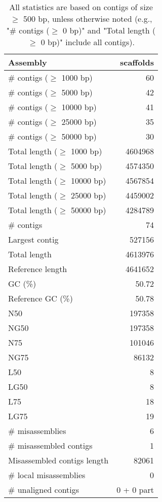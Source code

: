 \documentclass[12pt,a4paper]{article}
\begin{document}
\begin{table}[ht]
\begin{center}
\caption{All statistics are based on contigs of size $\geq$ 500 bp, unless otherwise noted (e.g., "\# contigs ($\geq$ 0 bp)" and "Total length ($\geq$ 0 bp)" include all contigs).}
\begin{tabular}{|l*{1}{|r}|}
\hline
Assembly & scaffolds \\ \hline
\# contigs ($\geq$ 1000 bp) & 60 \\ \hline
\# contigs ($\geq$ 5000 bp) & 42 \\ \hline
\# contigs ($\geq$ 10000 bp) & 41 \\ \hline
\# contigs ($\geq$ 25000 bp) & 35 \\ \hline
\# contigs ($\geq$ 50000 bp) & 30 \\ \hline
Total length ($\geq$ 1000 bp) & 4604968 \\ \hline
Total length ($\geq$ 5000 bp) & 4574350 \\ \hline
Total length ($\geq$ 10000 bp) & 4567854 \\ \hline
Total length ($\geq$ 25000 bp) & 4459002 \\ \hline
Total length ($\geq$ 50000 bp) & 4284789 \\ \hline
\# contigs & 74 \\ \hline
Largest contig & 527156 \\ \hline
Total length & 4613976 \\ \hline
Reference length & 4641652 \\ \hline
GC (\%) & 50.72 \\ \hline
Reference GC (\%) & 50.78 \\ \hline
N50 & 197358 \\ \hline
NG50 & 197358 \\ \hline
N75 & 101046 \\ \hline
NG75 & 86132 \\ \hline
L50 & 8 \\ \hline
LG50 & 8 \\ \hline
L75 & 18 \\ \hline
LG75 & 19 \\ \hline
\# misassemblies & 6 \\ \hline
\# misassembled contigs & 1 \\ \hline
Misassembled contigs length & 82061 \\ \hline
\# local misassemblies & 0 \\ \hline
\# unaligned contigs & 0 + 0 part \\ \hline

\end{tabular}
\end{center}
\end{table}
\end{document}
